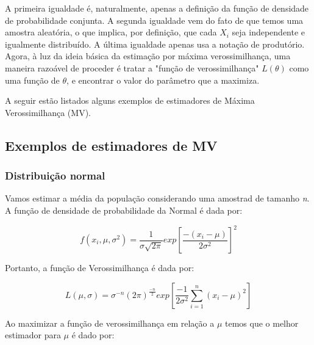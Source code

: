 A primeira igualdade é, naturalmente, apenas a definição da função de densidade de probabilidade conjunta. A segunda igualdade vem do fato de que temos uma amostra aleatória, o que implica, por definição, que cada  \begin{math} X_{i} \end{math} seja independente e igualmente distribuído. A última igualdade apenas usa a notação de produtório. Agora, à luz da ideia básica da estimação por máxima verossimilhança, uma maneira razoável de proceder é tratar a "função de verossimilhança"  \begin{math} L (\theta) \end{math} como uma função de \begin{math} \theta \end{math}, e encontrar o valor do parâmetro que a maximiza.

A seguir estão listados alguns exemplos de estimadores de Máxima Verossimilhança (MV).

\subsection{Exemplos de estimadores de MV}

\subsubsection{Distribuição normal}

Vamos estimar a média da população considerando uma amostrad de tamanho \emph{n}. A função de densidade de probabilidade da Normal é dada por:

\begin{equation}
f(x_{i}, \mu, \sigma^{2}) = \frac{1}{\sigma\sqrt{2\pi}}exp\left [ \frac{-(x_{i} - \mu)}{2\sigma^{2}} \right ]^{2}
\end{equation}

Portanto, a função de Verossimilhança é dada por:

\begin{equation}
L(\mu, \sigma) = \sigma^{-n}(2\pi)^{\frac{-n}{2}}exp\left [  \frac{-1}{2\sigma^2}\sum_{i=1}^{n}(x_{i}-\mu)^{2} \right ]
\end{equation}

 Ao maximizar a função de verossimilhança em relação a  \begin{math}
 \mu
 \end{math} temos que o melhor estimador para \begin{math} \mu \end{math} é dado por:
 
